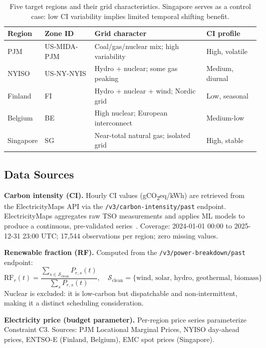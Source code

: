 \begin{table}[h]
\centering
\begin{tabularx}{\linewidth}{p{2.2cm}p{2.2cm}p{3.8cm}X}
\toprule
\textbf{Region} & \textbf{Zone ID} & \textbf{Grid character} & \textbf{CI profile} \\
\midrule
PJM       & US-MIDA-PJM & Coal/gas/nuclear mix; high variability & High, volatile \\
NYISO     & US-NY-NYIS  & Hydro + nuclear; some gas peaking      & Medium, diurnal \\
Finland   & FI          & Hydro + nuclear + wind; Nordic grid    & Low, seasonal \\
Belgium   & BE          & High nuclear; European interconnect    & Medium-low \\
Singapore & SG          & Near-total natural gas; isolated grid  & High, stable \\
\bottomrule
\end{tabularx}
\caption{Five target regions and their grid characteristics. Singapore serves as a control case: low CI variability implies limited temporal shifting benefit.}
\label{tab:regions}
\end{table}

\subsection{Data Sources}

\textbf{Carbon intensity (CI).}
Hourly CI values (gCO\textsubscript{2}eq/kWh) are retrieved from the ElectricityMaps API via the \texttt{/v3/carbon-intensity/past} endpoint.
ElectricityMaps aggregates raw TSO measurements and applies ML models to produce a continuous, pre-validated series~\cite{radovanovic2023}.
Coverage: 2024-01-01 00:00 to 2025-12-31 23:00 UTC; 17,544 observations per region; zero missing values.

\textbf{Renewable fraction (RF).}
Computed from the \texttt{/v3/power-breakdown/past} endpoint:
\[
  \mathrm{RF}_r(t) = \frac{\sum_{s \in \mathcal{S}_{\mathrm{clean}}} P_{r,s}(t)}{\sum_{s} P_{r,s}(t)},
  \quad \mathcal{S}_{\mathrm{clean}} = \{\text{wind, solar, hydro, geothermal, biomass}\}
\]
Nuclear is excluded: it is low-carbon but dispatchable and non-intermittent, making it a distinct scheduling consideration.

\textbf{Electricity price (budget parameter).}
Per-region price series parameterize Constraint C3.
Sources: PJM Locational Marginal Prices, NYISO day-ahead prices, ENTSO-E (Finland, Belgium), EMC spot prices (Singapore).

